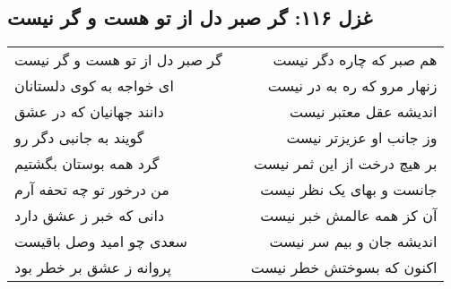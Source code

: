 \begin{center}
\section*{غزل ۱۱۶: گر صبر دل از تو هست و گر نیست}
\label{sec:116}
\begin{longtable}{l p{0.5cm} r}
گر صبر دل از تو هست و گر نیست
&&
هم صبر که چاره دگر نیست
\\
ای خواجه به کوی دلستانان
&&
زنهار مرو که ره به در نیست
\\
دانند جهانیان که در عشق
&&
اندیشه عقل معتبر نیست
\\
گویند به جانبی دگر رو
&&
وز جانب او عزیزتر نیست
\\
گرد همه بوستان بگشتیم
&&
بر هیچ درخت از این ثمر نیست
\\
من درخور تو چه تحفه آرم
&&
جانست و بهای یک نظر نیست
\\
دانی که خبر ز عشق دارد
&&
آن کز همه عالمش خبر نیست
\\
سعدی چو امید وصل باقیست
&&
اندیشه جان و بیم سر نیست
\\
پروانه ز عشق بر خطر بود
&&
اکنون که بسوختش خطر نیست
\\
\end{longtable}
\end{center}
